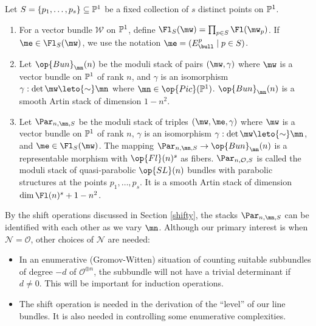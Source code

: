 \begin{defi}
\notready
Let  $S=\{p_1,\dots,p_s\}\subseteq \Bbb{P}^1$ be a fixed collection of $s$ distinct points on $\Bbb{P}^1$.
\begin{enumerate}
\item For a vector bundle $\mathcal{W}$ on $\Bbb{P}^1$, define $\Fl_S(\mw)=\prod_{p\in S} \Fl(\mw_p)$. If $\me\in \Fl_S(\mw)$, we use the notation $\me=(E^p_{\bull}\mid p\in S)$.
\item  Let $\op{Bun}_{\mn}(n)$ be the moduli stack of  pairs   $(\mw,\gamma)$ where $\mw$ is a vector bundle on $\Bbb{P}^1$ of rank $n$,  and $\gamma$ is an isomorphism $\gamma:\det \mw\leto{\sim}\mn$ where $\mn\in \op{Pic}(\Bbb{P}^1)$. $\op{Bun}_{\mn}(n)$ is a smooth Artin stack of dimension $1-n^2$.
\item  Let $\Par_{n,\mn,S}$ be the moduli  stack of triples $(\mw,\me,\gamma)$ where $\mw$ is a vector bundle on $\Bbb{P}^1$ of rank $n$,   $\gamma$ is an isomorphism $\gamma:\det \mw\leto{\sim}\mn$, and $\me\in\Fl_S(\mw)$. The mapping  $\Par_{n,\mn,S}\to\op{Bun}_{\mn}(n)$ is a representable morphism
with $\op{Fl}(n)^s$ as fibers. $\Par_{n,\mathcal{O},S}$ is called the moduli  stack
of quasi-parabolic $\op{SL}(n)$ bundles with parabolic structures at the points $p_1,\dots,p_s$. It is a smooth Artin stack of dimension $\dim \Fl(n)^s + 1-n^2$.
\end{enumerate}
\end{defi}
By the shift operations discussed in Section \ref{shifty}, the stacks $\Par_{n,\mn,S}$ can be identified with each other as we vary $\mn$. Although our primary interest is when $\mathcal{N}=\mathcal{O}$, other choices of $\mathcal{N}$ are needed:
 \begin{itemize}
 \item[-]  In an enumerative (Gromov-Witten) situation of counting suitable subbundles of degree $-d$ of $\mathcal{O}^{\oplus n}$, the subbundle will not have a trivial determinant if $d\neq 0$. This will be important for induction operations.
 \item[-] The shift operation is needed in the derivation of the ``level'' of our line bundles. It is also needed in controlling some enumerative complexities.
 \end{itemize}
